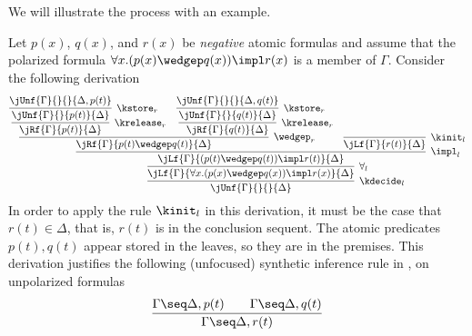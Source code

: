 \documentclass{llncs}
\begin{document}
We will illustrate the process with an example.
\begin{example}\label{ex:bipole}
Let $p(x)$, $q(x)$, and $r(x)$ be {\em negative} atomic
formulas and assume that the polarized formula $\forall x. (p(x)
 \wedgep q(x))\impl r(x)$ is a member of
$\Gamma$.
%
Consider the following \LKF derivation 
\[
  \infer[\kdecide_l]{\jUnf{\Gamma}{}{}{\Delta}}{
  \infer[\forall_l]{\jLf{\Gamma}{\forall x. (p(x)
                    \wedgep q(x))\impl r(x)}{\Delta}}
 {\infer[\impl_l]{\jLf{\Gamma}{(p(t)
                    \wedgep q(t))\impl r(t)}{\Delta}}
   {\infer[\wedgep_r]{\jRf{\Gamma}{p(t)\wedgep q(t)}{\Delta}}
   {\infer[\krelease_r]{\jRf{\Gamma}{p(t)}{\Delta}}
    {\infer[\kstore_r]{\jUnf{\Gamma}{}{p(t)}{\Delta}}
   {\deduce{\jUnf{\Gamma}{}{}{\Delta,p(t)}}{}}}
   &
   \infer[\krelease_r]{\jRf{\Gamma}{q(t)}{\Delta}}
   {\infer[\kstore_r]{\jUnf{\Gamma}{}{q(t)}{\Delta}}
   {\deduce{\jUnf{\Gamma}{}{}{\Delta,q(t)}}{}}}}
   & 
   \infer[\kinit_l]{\jLf{\Gamma}{ r(t)}{\Delta}}
  {}}}}
\]	
%
In order to apply the rule $\kinit_l$ in this derivation, it must be
the case that $r(t) \in\Delta$, that is, $r(t)$ is in the conclusion sequent. The atomic predicates $p(t), q(t)$ appear stored in the leaves, so they are in the premises. 
%
This derivation justifies the following (unfocused) synthetic inference rule in \LK,
on unpolarized formulas %
\[
  \infer{\Gamma\seq \Delta, r(t)}
        {\Gamma\seq \Delta, p(t) \qquad 
         \Gamma\seq \Delta, q(t)}	
\]
\end{example}
\end{document}
